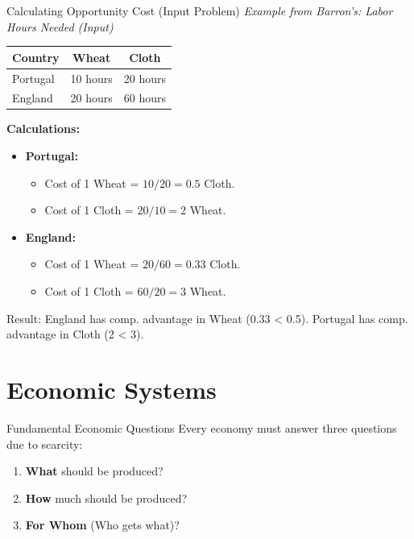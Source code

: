 \documentclass{beamer}
\begin{document}
\begin{frame}{Calculating Opportunity Cost (Input Problem)}
    \textit{Example from Barron's: Labor Hours Needed (Input)}
    
    \begin{table}[]
        \begin{tabular}{lcc}
            \toprule
            Country & Wheat & Cloth \\
            \midrule
            Portugal & 10 hours & 20 hours \\
            England & 20 hours & 60 hours \\
            \bottomrule
        \end{tabular}
    \end{table}

    \textbf{Calculations:}
    \begin{itemize}
        \item \textbf{Portugal:} 
            \begin{itemize}
                \item Cost of 1 Wheat = $10/20 = 0.5$ Cloth.
                \item Cost of 1 Cloth = $20/10 = 2$ Wheat.
            \end{itemize}
        \item \textbf{England:} 
            \begin{itemize}
                \item Cost of 1 Wheat = $20/60 = 0.33$ Cloth.
                \item Cost of 1 Cloth = $60/20 = 3$ Wheat.
            \end{itemize}
    \end{itemize}
    \footnotesize{Result: England has comp. advantage in Wheat (0.33 < 0.5). Portugal has comp. advantage in Cloth (2 < 3).}
\end{frame}

\section{Economic Systems}

\begin{frame}{Fundamental Economic Questions}
    Every economy must answer three questions due to scarcity:
    
    \begin{enumerate}
        \item \textbf{What} should be produced?
        \item \textbf{How} much should be produced?
        \item \textbf{For Whom} (Who gets what)?
    \end{enumerate}
\end{frame}
\end{document}
